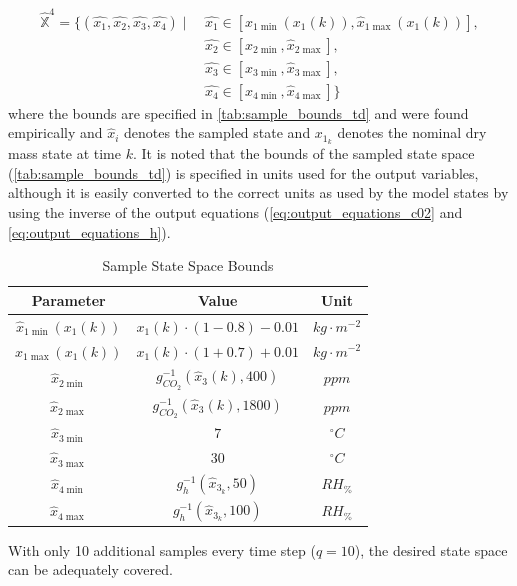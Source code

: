 \begin{equation}\label{eq:td_state_space}
\begin{split}
\hat{\mathbb{X}}^4 = \{ (\hat{x_1}, \hat{x_2}, \hat{x_3}, \hat{x_4}) \mid\ & \hat{x_1} \in [\hat{x}_{1\min}(x_{1}(k)), \hat{x}_{1\max}(x_{1}(k))], \\
& \hat{x_2} \in [\hat{x}_{2\min}, \hat{x}_{2\max}], \\
& \hat{x_3} \in [\hat{x}_{3\min}, \hat{x}_{3\max}], \\
& \hat{x_4} \in [\hat{x}_{4\min}, \hat{x}_{4\max}] \}
\end{split}
\end{equation}
where the bounds are specified in \autoref{tab:sample_bounds_td} and were found empirically and $\hat{x}_i$ denotes the sampled state and $x_{1_k}$ denotes the nominal dry mass state at time $k$. It is noted that the bounds of the sampled state space (\autoref{tab:sample_bounds_td}) is specified in units used for the output variables, although it is easily converted to the correct units as used by the model states by using the inverse of the output equations (\autoref{eq:output_equations_c02} and \autoref{eq:output_equations_h}).

\begin{table}[H]
	\centering
	\begin{tabular}{|c|c|c|}
		\hline
		\textbf{Parameter} & \textbf{Value} & \textbf{Unit} \\
		\hline
		$\hat{x}_{1\min}(x_{1}(k))$ & $x_{1}(k) \cdot (1 - 0.8) - 0.01$ & $kg \cdot m^{-2}$ \\
		$\hat{x}_{1\max}(x_{1}(k))$ & $x_{1}(k) \cdot (1 + 0.7) + 0.01$ & $kg \cdot m^{-2}$ \\
		$\hat{x}_{2\min}$ & $g_{CO_2}^{-1} (\hat{x}_{3}(k), 400)$ & $ppm$ \\
		$\hat{x}_{2\max}$ & $g_{CO_2}^{-1} (\hat{x}_{3}(k), 1800)$ & $ppm$ \\
		$\hat{x}_{3\min}$ & $7$ & $^\circ C$ \\
		$\hat{x}_{3\max}$ & $30$ & $^\circ C$ \\
		$\hat{x}_{4\min}$ & $g_{h}^{-1} (\hat{x}_{3_k}, 50)$ & $RH_{\%}$ \\
		$\hat{x}_{4\max}$ & $g_{h}^{-1} (\hat{x}_{3_k}, 100)$ & $RH_{\%}$ \\
		\hline
	\end{tabular}
	\caption{Sample State Space Bounds}
	\label{tab:sample_bounds_td}
\end{table}


With only 10 additional samples every time step ($q=10$), the desired state space can be adequately covered.

